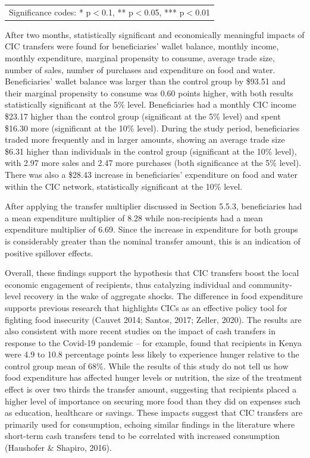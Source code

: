 \documentclass[12pt]{article}
\begin{document}
\begin{table}[h!]
\begin{tabular}{lcc}
    \\
    \multicolumn{3}{p{5.5in}}{Significance codes: * p$<$0.1, ** p$<$0.05, *** p$<$0.01} \\
    \end{tabular}
\end{table}

After two months, statistically significant and economically meaningful impacts of CIC transfers were found for beneficiaries’ wallet balance, monthly income, monthly expenditure, marginal propensity to consume, average trade size, number of sales, number of purchases and expenditure on food and water. Beneficiaries’ wallet balance was larger than the control group by \$93.51 and their marginal propensity to consume was 0.60 points higher, with both results statistically significant at the 5\% level. Beneficiaries had a monthly CIC income \$23.17 higher than the control group (significant at the 5\% level) and spent \$16.30 more (significant at the 10\% level). During the study period, beneficiaries traded more frequently and in larger amounts, showing an average trade size \$6.31 higher than individuals in the control group (significant at the 10\% level), with 2.97 more sales and 2.47 more purchases (both significance at the 5\% level). There was also a \$28.43 increase in beneficiaries’ expenditure on food and water within the CIC network, statistically significant at the 10\% level.

After applying the transfer multiplier discussed in Section 5.5.3, beneficiaries had a mean expenditure multiplier of 8.28 while non-recipients had a mean expenditure multiplier of 6.69. Since the increase in expenditure for both groups is considerably greater than the nominal transfer amount, this is an indication of positive spillover effects.

Overall, these findings support the hypothesis that CIC transfers boost the local economic engagement of recipients, thus catalyzing individual and community-level recovery in the wake of aggregate shocks. The difference in food expenditure supports previous research that highlights CICs as an effective policy tool for fighting food insecurity (Cauvet 2014; Santos, 2017; Zeller, 2020). The results are also consistent with more recent studies on the impact of cash transfers in response to the Covid-19 pandemic – for example, \cite{banerjee2020effects} found that recipients in Kenya were 4.9 to 10.8 percentage points less likely to experience hunger relative to the control group mean of 68\%. While the results of this study do not tell us how food expenditure has affected hunger levels or nutrition, the size of the treatment effect is over two thirds the transfer amount, suggesting that recipients placed a higher level of importance on securing more food than they did on expenses such as education, healthcare or savings. These impacts suggest that CIC transfers are primarily used for consumption, echoing similar findings in the literature where short-term cash transfers tend to be correlated with increased consumption (Haushofer \& Shapiro, 2016).
\end{document}
